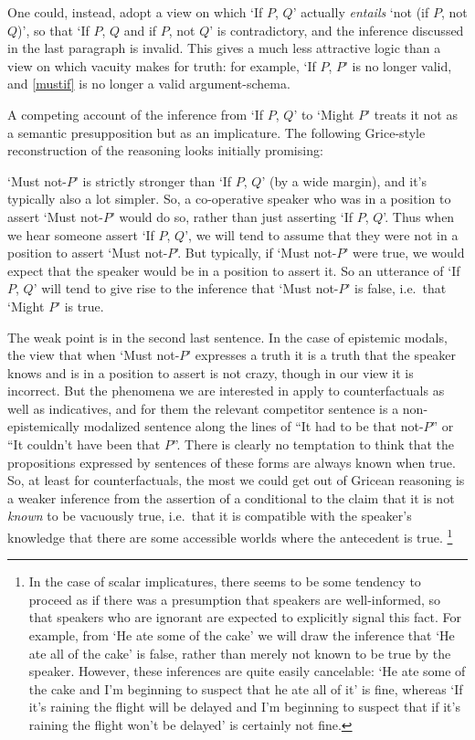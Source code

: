 \documentclass[If.tex]{subfiles}
\begin{document}
One could, instead, adopt a view on which ‘If $P$, $Q$’ actually \emph{entails} ‘not (if $P$, not $Q$)’, so that ‘If $P$, $Q$ and if $P$, not $Q$’ is contradictory, and the inference discussed in the last paragraph is invalid.  This gives a much less attractive logic than a view on which vacuity makes for truth: for example, ‘If $P$, $P$’ is no longer valid, and \ref{mustif} is no longer a valid argument-schema.  




A competing account of the inference from ‘If $P$, $Q$’ to ‘Might $P$’ treats it not as a semantic presupposition but as an implicature.  The following Grice-style reconstruction of the reasoning looks initially promising:
\begin{prop}
	\ritem
	‘Must not-$P$’ is strictly stronger than ‘If $P$, $Q$’ (by a wide margin), and it's typically also a lot simpler.  So, a co-operative speaker who was in a position to assert ‘Must not-$P$’ would do so, rather than just asserting ‘If $P$, $Q$’.   Thus when we hear someone assert ‘If $P$, $Q$’, we will tend to assume that they were not in a position to assert ‘Must not-$P$’.  But typically, if ‘Must not-$P$’ were true, we would expect that the speaker would be in a position to assert it.  So an utterance of ‘If $P$, $Q$’ will tend to give rise to the inference that ‘Must not-$P$’ is false, i.e.\ that ‘Might $P$’ is true.  
\end{prop}
The weak point is in the second last sentence.  In the case of epistemic modals, the view that when ‘Must not-$P$’ expresses a truth it is a truth that the speaker knows and is in a position to assert is not crazy, though in our view it is incorrect.  But the phenomena we are interested in apply to counterfactuals as well as indicatives, and for them the relevant competitor sentence is a non-epistemically modalized sentence along the lines of “It had to be that not-$P$” or “It couldn't have been that $P$”.  There is clearly no temptation to think that the propositions expressed by sentences of these forms are always known when true.  So, at least for counterfactuals, the most we could get out of Gricean reasoning is a weaker inference from the assertion of a conditional to the claim that it is not \emph{known} to be vacuously true, i.e.\ that it is compatible with the speaker's knowledge that there are some accessible worlds where the antecedent is true.%
\footnote{In the case of scalar implicatures, there seems to be some tendency to proceed as if there was a presumption that speakers are well-informed, so that speakers who are ignorant are expected to explicitly signal this fact.  For example, from ‘He ate some of the cake’ we will draw the inference that ‘He ate all of the cake’ is false, rather than merely not known to be true by the speaker.  However, these inferences are quite easily cancelable: ‘He ate some of the cake and I'm beginning to suspect that he ate all of it’ is fine, whereas ‘If it's raining the flight will be delayed and I'm beginning to suspect that if it's raining the flight won't be delayed’ is certainly not fine.}  
\end{document}
